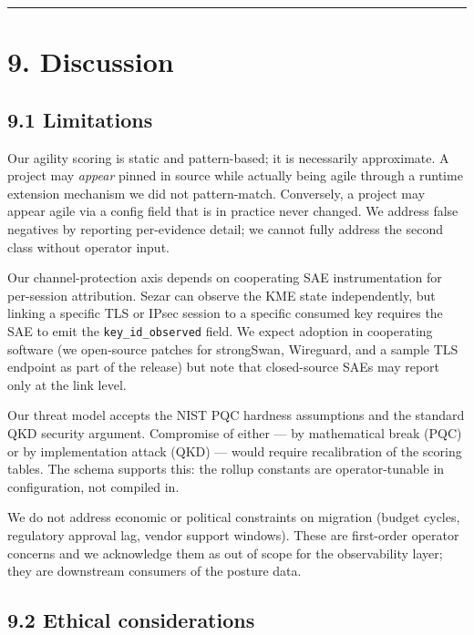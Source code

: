 \begin{center}\rule{0.5\linewidth}{0.5pt}\end{center}

\section{9. Discussion}\label{discussion}

\subsection{9.1 Limitations}\label{limitations}

Our agility scoring is static and pattern-based; it is necessarily
approximate. A project may \emph{appear} pinned in source while actually
being agile through a runtime extension mechanism we did not
pattern-match. Conversely, a project may appear agile via a config field
that is in practice never changed. We address false negatives by
reporting per-evidence detail; we cannot fully address the second class
without operator input.

Our channel-protection axis depends on cooperating SAE instrumentation
for per-session attribution. Sezar can observe the KME state
independently, but linking a specific TLS or IPsec session to a specific
consumed key requires the SAE to emit the \texttt{key\_id\_observed}
field. We expect adoption in cooperating software (we open-source
patches for strongSwan, Wireguard, and a sample TLS endpoint as part of
the release) but note that closed-source SAEs may report only at the
link level.

Our threat model accepts the NIST PQC hardness assumptions and the
standard QKD security argument. Compromise of either --- by mathematical
break (PQC) or by implementation attack (QKD) --- would require
recalibration of the scoring tables. The schema supports this: the
rollup constants are operator-tunable in configuration, not compiled in.

We do not address economic or political constraints on migration (budget
cycles, regulatory approval lag, vendor support windows). These are
first-order operator concerns and we acknowledge them as out of scope
for the observability layer; they are downstream consumers of the
posture data.

\subsection{9.2 Ethical considerations}\label{ethical-considerations}


